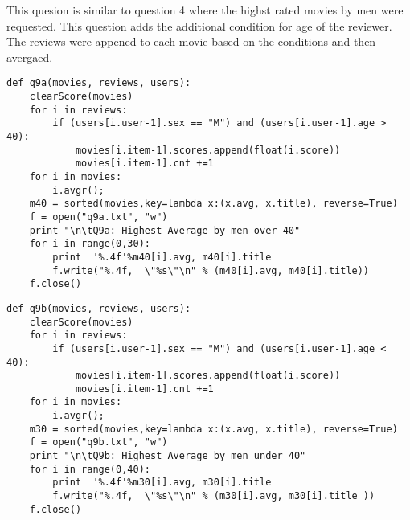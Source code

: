 \begin{flushleft}
This quesion is similar to question 4 where the highst rated movies by men were requested. This question adds the additional condition for age of the reviewer. The reviews were appened to each movie based on the conditions and then avergaed. 


\begin{lstlisting}[caption={Python code to for men over 40}]
def q9a(movies, reviews, users):
	clearScore(movies)
	for i in reviews:
		if (users[i.user-1].sex == "M") and (users[i.user-1].age > 40):
			movies[i.item-1].scores.append(float(i.score))
			movies[i.item-1].cnt +=1
	for i in movies:
		i.avgr(); 
	m40 = sorted(movies,key=lambda x:(x.avg, x.title), reverse=True)
	f = open("q9a.txt", "w")
	print "\n\tQ9a: Highest Average by men over 40"
	for i in range(0,30):
		print  '%.4f'%m40[i].avg, m40[i].title
		f.write("%.4f,  \"%s\"\n" % (m40[i].avg, m40[i].title))
	f.close()
\end{lstlisting}


\begin{lstlisting}[caption={Python code to for men under 40}]
def q9b(movies, reviews, users):
	clearScore(movies)
	for i in reviews:
		if (users[i.user-1].sex == "M") and (users[i.user-1].age < 40):
			movies[i.item-1].scores.append(float(i.score))
			movies[i.item-1].cnt +=1
	for i in movies:
		i.avgr(); 
	m30 = sorted(movies,key=lambda x:(x.avg, x.title), reverse=True)
	f = open("q9b.txt", "w")
	print "\n\tQ9b: Highest Average by men under 40"
	for i in range(0,40):
		print  '%.4f'%m30[i].avg, m30[i].title 	
		f.write("%.4f,  \"%s\"\n" % (m30[i].avg, m30[i].title ))
	f.close()
\end{lstlisting}


\end{flushleft}
